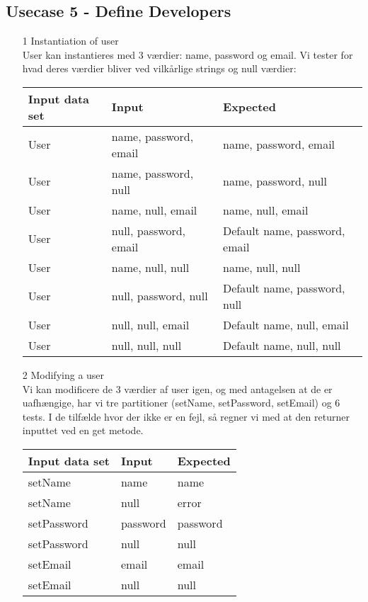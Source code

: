 \documentclass[a4paper,12pt]{article}
\begin{document}
\subsection{Usecase 5 - Define Developers}
\begin{enumerate}
	\item[1] Instantiation of user \\
		User kan instantieres med 3 værdier: name, password og email. Vi tester for hvad deres værdier bliver ved vilkårlige strings og null værdier:
			\begin{center}
			\begin{tabular}{|l|l|l|}
				\hline
				Input data set & Input & Expected \\
				\hline
				User & name, password, email & name, password, email \\
				User & name, password, null & name, password, null \\
				User & name, null, email & name, null, email \\
				User & null, password, email & Default name, password, email \\
				User & name, null, null & name, null, null \\
				User & null, password, null & Default name, password, null \\
				User & null, null, email & Default name, null, email \\
				User & null, null, null & Default name, null, null \\
				\hline
			\end{tabular}
			\end{center}
	\item[2] Modifying a user \\
		Vi kan modificere de 3 værdier af user igen, og med antagelsen at de er uafhængige, har vi tre partitioner (setName, setPassword, setEmail) og 6 tests. I de tilfælde hvor der ikke er en fejl, så regner vi med at den returner inputtet ved en get metode.
			\begin{center}
			\begin{tabular}{|l|l|l|}
				\hline
				Input data set & Input & Expected \\
				\hline
				setName & name & name \\
				setName & null & error \\
				setPassword & password & password \\
				setPassword & null & null \\
				setEmail & email & email \\
				setEmail & null & null \\
				\hline
			\end{tabular}
			\end{center}
\end{enumerate}
\end{document}
